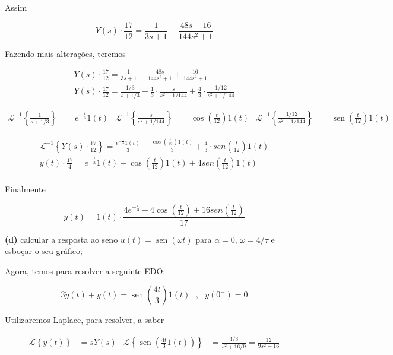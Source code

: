 \documentclass{article}
\DeclareMathOperator{\sen}{sen}
\begin{document}
Assim

\[Y(s) \cdot \frac{17}{12} = \frac{1}{3s + 1} - \frac{48s - 16}{144s^2 + 1}\]

Fazendo mais alterações, teremos

\begin{align*}
    Y(s) \cdot \frac{17}{12} = \frac{1}{3s + 1} - \frac{48s}{144s^2 + 1} + \frac{16}{144s^2 + 1}\\
    Y(s) \cdot \frac{17}{12} = \frac{1/3}{s + 1/3} - \frac{1}{3}\cdot\frac{s}{s^2 + 1/144} + \frac{4}{3}\cdot\frac{1/12}{s^2 + 1/144}
\end{align*}

\begin{align*}
    \mathcal{L}^{-1} \left\{\frac{1}{s + 1/3}\right\} &= e^{-\frac{t}{3}}1(t) & \mathcal{L}^{-1} \left\{\frac{s}{s^2 + 1/144}\right\} &= \cos\left(\frac{t}{12}\right)1(t) & \mathcal{L}^{-1} \left\{\frac{1/12}{s^2 + 1/144}\right\} &= \sen\left(\frac{t}{12}\right)1(t)
\end{align*}

\begin{align*}
    \mathcal{L}^{-1} \left\{Y(s) \cdot \frac{17}{12}\right\} = \frac{e^{-\frac{t}{3}}1(t)}{3} - \frac{\cos\left(\frac{t}{12}\right)1(t)}{3} + \frac{4}{3}\cdot sen\left(\frac{t}{12}\right)1(t)\\
    y(t) \cdot \frac{17}{4} = e^{-\frac{t}{3}}1(t) - \cos\left(\frac{t}{12}\right)1(t) + 4sen\left(\frac{t}{12}\right)1(t)\\
\end{align*}

Finalmente

\[y(t) = 1(t)\cdot\frac{4e^{-\frac{t}{3}} - 4\cos\left(\frac{t}{12}\right) + 16sen\left(\frac{t}{12}\right)}{17}\]

\textbf{(d)} calcular a resposta ao seno $u(t) = \sen(\omega t)$ para $\alpha = 0,\, \omega = 4/\tau$ e esboçar o seu gráfico;

Agora, temos para resolver a seguinte EDO:

\[ 3\dot{y}(t) + y(t) = \sen\left(\frac{4t}{3}\right)1(t) \,\,\,\,,\,\,\,\, y(0^-) = 0\]

Utilizaremos Laplace, para resolver, a saber

\begin{align*}
    \mathcal{L}\left\{\dot{y}(t)\right\} &= sY(s) & \mathcal{L}\left\{\sen \left(\frac{4t}{3}1(t)\right) \right\} &= \frac{4/3}{s^2 + 16/9} = \frac{12}{9s^2 + 16}
\end{align*}
\end{document}
